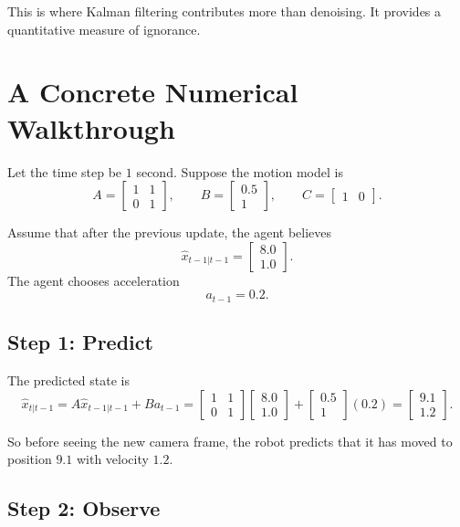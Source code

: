 \documentclass[12pt,a4paper]{article}
\begin{document}
This is where Kalman filtering contributes more than denoising. It provides a quantitative measure of ignorance.

\section{A Concrete Numerical Walkthrough}

Let the time step be \(1\) second. Suppose the motion model is
\[
A =
\begin{bmatrix}
1 & 1\\
0 & 1
\end{bmatrix},
\qquad
B =
\begin{bmatrix}
0.5\\
1
\end{bmatrix},
\qquad
C =
\begin{bmatrix}
1 & 0
\end{bmatrix}.
\]

Assume that after the previous update, the agent believes
\[
\hat{x}_{t-1|t-1} =
\begin{bmatrix}
8.0\\
1.0
\end{bmatrix}.
\]
The agent chooses acceleration
\[
a_{t-1} = 0.2.
\]

\subsection{Step 1: Predict}

The predicted state is
\[
\hat{x}_{t|t-1}
=
A\hat{x}_{t-1|t-1} + Ba_{t-1}
=
\begin{bmatrix}
1 & 1\\
0 & 1
\end{bmatrix}
\begin{bmatrix}
8.0\\
1.0
\end{bmatrix}
+
\begin{bmatrix}
0.5\\
1
\end{bmatrix}
(0.2)
=
\begin{bmatrix}
9.1\\
1.2
\end{bmatrix}.
\]

So before seeing the new camera frame, the robot predicts that it has moved to position \(9.1\) with velocity \(1.2\).

\subsection{Step 2: Observe}
\end{document}
